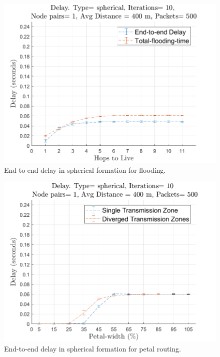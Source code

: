 \begin{figure}[hbtp]
\centering
\includegraphics[width=\simResultFigSize\textwidth]{ncsuthesis-0.6/Chapter-5/figs/fl_delay_spherical.png}
\caption{End-to-end delay in spherical formation for flooding. }
\label{fig:fl_delay_spherical}
\end{figure}

\begin{figure}[hbtp]
\centering
\includegraphics[width=\simResultFigSize\textwidth]{ncsuthesis-0.6/Chapter-5/figs/pe_delay_spherical.png}
\caption{End-to-end delay in spherical formation for petal routing.}
\label{fig:pe_delay_spherical}
\end{figure}

